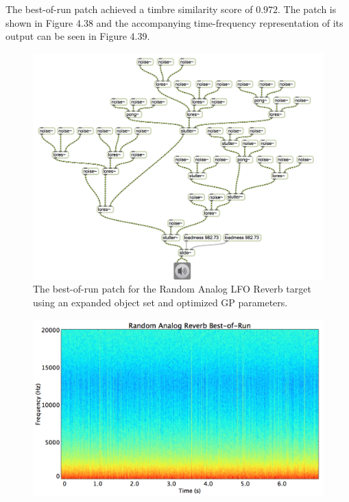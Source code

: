 \documentclass[a4paper,12pt]{report} 	%
\numberwithin{figure}{chapter}
\numberwithin{table}{chapter}
\numberwithin{equation}{chapter}
\begin{document}
\begin{flushleft}
The best-of-run patch achieved a timbre similarity score of $0.972$. The patch is shown in Figure 4.38 and the accompanying time-frequency representation of its output can be seen in Figure 4.39.

\begin{figure}[h!]
\begin{center}
\includegraphics[angle=270, scale=0.65]{RandomAnalog_Best}
\caption[Random Analog LFO Reverb Best-of-Run Patch]{The best-of-run patch for the Random Analog LFO Reverb target using an expanded object set and optimized GP parameters.}
\end{center}
\end{figure}
\begin{figure}[h!]
\begin{center}
\includegraphics[scale=0.35,width=\linewidth]{RandomAnalogReverbBestOfRunSTFT}

\end{center}
\end{figure}
\end{flushleft}
\end{document}
